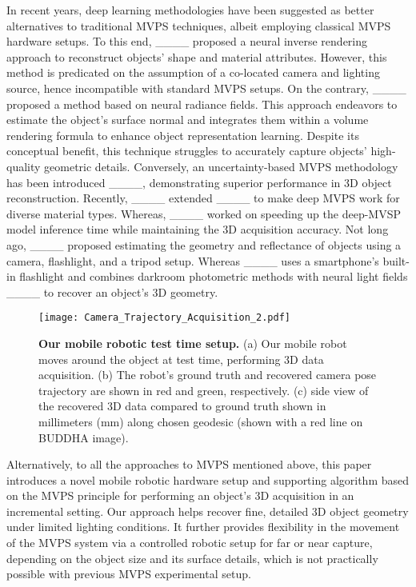 \vspace{-0.2cm}
In recent years, deep learning methodologies have been suggested as better alternatives to traditional MVPS techniques, albeit employing classical MVPS hardware setups. To this end, ____ proposed a neural inverse rendering approach to reconstruct objects' shape and material attributes. However, this method is predicated on the assumption of a co-located camera and lighting source, hence incompatible with standard MVPS setups. On the contrary, ____  proposed a method based on neural radiance fields. This approach endeavors to estimate the object's surface normal and integrates them within a volume rendering formula to enhance object representation learning. Despite its conceptual benefit, this technique struggles to accurately capture objects' high-quality geometric details.
Conversely, an uncertainty-based MVPS methodology has been introduced ____, demonstrating superior performance in 3D object reconstruction. Recently, ____ extended ____ to make deep MVPS work for diverse material types. Whereas, ____ worked on speeding up the deep-MVSP model inference time while maintaining the 3D acquisition accuracy. Not long ago, ____ proposed estimating the geometry and reflectance of objects using a camera, flashlight, and a tripod setup. Whereas ____ uses a smartphone’s built-in flashlight and combines darkroom photometric methods with neural light fields ____ to recover an object's 3D geometry. 

\begin{figure*}[t]
    \centering
\texttt{[image: Camera\_Trajectory\_Acquisition\_2.pdf]}
    \caption{\textbf{Our mobile robotic test time setup.} (a) Our mobile robot moves around the object at test time, performing 3D data acquisition. (b) The robot's ground truth and recovered camera pose trajectory are shown in red and green, respectively. (c) side view of the recovered 3D data compared to ground truth shown in millimeters (mm) along chosen geodesic (shown with a red line on BUDDHA image).}
    \label{fig:img_acquisition_camera_traj}
\end{figure*}

\smallskip
\smallskip
\noindent
Alternatively, to all the approaches to MVPS mentioned above, this paper introduces a novel mobile robotic hardware setup and supporting algorithm based on the MVPS principle for performing an object's 3D acquisition in an incremental setting. Our approach helps recover fine, detailed 3D object geometry under limited lighting conditions. It further provides flexibility in the movement of the MVPS system via a controlled robotic setup for far or near capture, depending on the object size and its surface details, which is not practically possible with previous MVPS experimental setup.